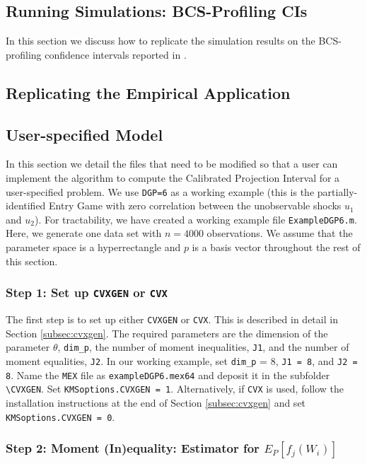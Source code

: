 \documentclass[12pt]{article}
\def\code#1{\texttt{#1}}
\begin{document}
\subsection{Running Simulations: BCS-Profiling CIs}
In this section we discuss how to replicate the simulation results on the BCS-profiling confidence intervals reported in \cite{kaido2019confidence}.

\subsection{Replicating the Empirical Application}

\subsection{User-specified Model}\label{sec:usermodel}
In this section we detail the files that need to be modified so that a user can implement the algorithm to compute the Calibrated Projection Interval for a user-specified problem.  We use \code{DGP=6} as a working example (this is the partially-identified Entry Game with zero correlation between the unobservable shocks $u_1$ and $u_2$).  For tractability, we have created a working example file \code{ExampleDGP6.m}.  Here, we generate one data set with $n=4000$ observations.  We assume that the parameter space is a hyperrectangle and $p$ is a basis vector throughout the rest of this section.

\subsubsection*{Step 1: Set up \code{CVXGEN} or \code{CVX}}

The first step is to set up either \code{CVXGEN} or \code{CVX}.  This is described in detail in Section \ref{subsec:cvxgen}.  The required parameters are the dimension of the parameter $\theta$, \code{dim\_p}, the number of moment inequalities, \code{J1}, and the number of moment equalities, \code{J2}.  In our working example, set \code{dim\_p} = 8, \code{J1 = 8}, and \code{J2 = 8}.  Name the \code{MEX} file as \code{exampleDGP6.mex64} and deposit it in the subfolder \code{\textbackslash CVXGEN}.  Set \code{KMSoptions.CVXGEN = 1}.  Alternatively, if \code{CVX} is used, follow the installation instructions at the end of Section \ref{subsec:cvxgen} and set \code{KMSoptions.CVXGEN = 0}.

\subsubsection*{Step 2: Moment (In)equality: Estimator for $E_P[f_j(W_i)]$}
\end{document}
